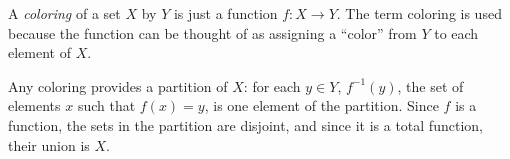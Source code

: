 \documentclass[12pt]{article}
\begin{document}
A \emph{coloring} of a set $X$ by $Y$ is just a function $f:X\rightarrow Y$.  The term coloring is used because the function can be thought of as assigning a ``color'' from $Y$ to each element of $X$.

Any coloring provides a partition of $X$: for each $y\in Y$, $f^{-1}(y)$, the set of elements $x$ such that $f(x)=y$, is one element of the partition.  Since $f$ is a function, the sets in the partition are disjoint, and since it is a total function, their union is $X$.
\end{document}
